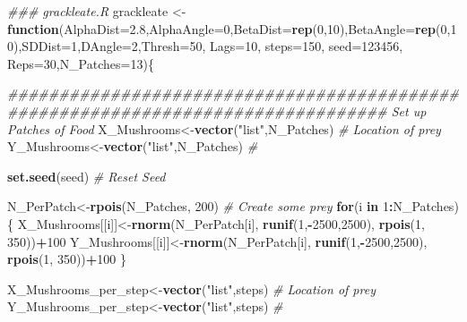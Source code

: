 \documentclass[
]{article}
\newenvironment{Shaded}{\begin{snugshade}}{\end{snugshade}}
\newcommand{\CommentTok}[1]{\textcolor[rgb]{0.56,0.35,0.01}{\textit{#1}}}
\newcommand{\ControlFlowTok}[1]{\textcolor[rgb]{0.13,0.29,0.53}{\textbf{#1}}}
\newcommand{\DataTypeTok}[1]{\textcolor[rgb]{0.13,0.29,0.53}{#1}}
\newcommand{\DecValTok}[1]{\textcolor[rgb]{0.00,0.00,0.81}{#1}}
\newcommand{\FloatTok}[1]{\textcolor[rgb]{0.00,0.00,0.81}{#1}}
\newcommand{\KeywordTok}[1]{\textcolor[rgb]{0.13,0.29,0.53}{\textbf{#1}}}
\newcommand{\NormalTok}[1]{#1}
\newcommand{\OperatorTok}[1]{\textcolor[rgb]{0.81,0.36,0.00}{\textbf{#1}}}
\newcommand{\StringTok}[1]{\textcolor[rgb]{0.31,0.60,0.02}{#1}}
\begin{document}
\begin{Shaded}
\begin{Highlighting}[]
\CommentTok{### grackleate.R}
\NormalTok{grackleate <-}\StringTok{ }\ControlFlowTok{function}\NormalTok{(}\DataTypeTok{AlphaDist=}\FloatTok{2.8}\NormalTok{,}\DataTypeTok{AlphaAngle=}\DecValTok{0}\NormalTok{,}\DataTypeTok{BetaDist=}\KeywordTok{rep}\NormalTok{(}\DecValTok{0}\NormalTok{,}\DecValTok{10}\NormalTok{),}\DataTypeTok{BetaAngle=}\KeywordTok{rep}\NormalTok{(}\DecValTok{0}\NormalTok{,}\DecValTok{10}\NormalTok{),}\DataTypeTok{SDDist=}\DecValTok{1}\NormalTok{,}\DataTypeTok{DAngle=}\DecValTok{2}\NormalTok{,}\DataTypeTok{Thresh=}\DecValTok{50}\NormalTok{, }\DataTypeTok{Lags=}\DecValTok{10}\NormalTok{, }\DataTypeTok{steps=}\DecValTok{150}\NormalTok{, }\DataTypeTok{seed=}\DecValTok{123456}\NormalTok{, }\DataTypeTok{Reps=}\DecValTok{30}\NormalTok{,}\DataTypeTok{N_Patches=}\DecValTok{13}\NormalTok{)\{}

\CommentTok{################################################################################# Set up Patches of Food                                                }
\NormalTok{X_Mushrooms<-}\KeywordTok{vector}\NormalTok{(}\StringTok{"list"}\NormalTok{,N_Patches)                                           }\CommentTok{# Location of prey}
\NormalTok{Y_Mushrooms<-}\KeywordTok{vector}\NormalTok{(}\StringTok{"list"}\NormalTok{,N_Patches)                                           }\CommentTok{# }

\KeywordTok{set.seed}\NormalTok{(seed)                                                                  }\CommentTok{# Reset Seed}

\NormalTok{N_PerPatch<-}\KeywordTok{rpois}\NormalTok{(N_Patches, }\DecValTok{200}\NormalTok{)                                               }\CommentTok{# Create some prey}
\ControlFlowTok{for}\NormalTok{(i }\ControlFlowTok{in} \DecValTok{1}\OperatorTok{:}\NormalTok{N_Patches)\{}
\NormalTok{X_Mushrooms[[i]]<-}\KeywordTok{rnorm}\NormalTok{(N_PerPatch[i], }\KeywordTok{runif}\NormalTok{(}\DecValTok{1}\NormalTok{,}\OperatorTok{-}\DecValTok{2500}\NormalTok{,}\DecValTok{2500}\NormalTok{), }\KeywordTok{rpois}\NormalTok{(}\DecValTok{1}\NormalTok{, }\DecValTok{350}\NormalTok{))}\OperatorTok{+}\DecValTok{100}
\NormalTok{Y_Mushrooms[[i]]<-}\KeywordTok{rnorm}\NormalTok{(N_PerPatch[i], }\KeywordTok{runif}\NormalTok{(}\DecValTok{1}\NormalTok{,}\OperatorTok{-}\DecValTok{2500}\NormalTok{,}\DecValTok{2500}\NormalTok{), }\KeywordTok{rpois}\NormalTok{(}\DecValTok{1}\NormalTok{, }\DecValTok{350}\NormalTok{))}\OperatorTok{+}\DecValTok{100}
\NormalTok{\}}

\NormalTok{X_Mushrooms_per_step<-}\KeywordTok{vector}\NormalTok{(}\StringTok{"list"}\NormalTok{,steps)                                      }\CommentTok{# Location of prey}
\NormalTok{Y_Mushrooms_per_step<-}\KeywordTok{vector}\NormalTok{(}\StringTok{"list"}\NormalTok{,steps)                                      }\CommentTok{#}


\end{Highlighting}
\end{Shaded}
\end{document}
